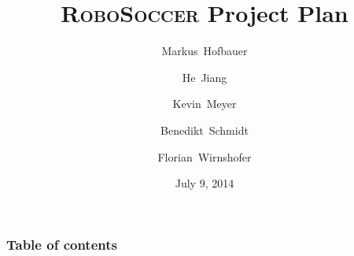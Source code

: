 \documentclass[hyperref={pdfpagelabels=false},compress]{beamer}
\title{\textsc{RoboSoccer} Project Plan}
\author[Hofbauer, Jiang, Meyer, Schmidt, Wirnshofer]{
  Markus~Hofbauer \and
  He~Jiang \and
  Kevin~Meyer \and
  Benedikt~Schmidt \and
  Florian~Wirnshofer
}
\institute
{
	Technische Universität München, Germany
}
\date{July 9, 2014}
\begin{document}
\begin{frame}
	\titlepage
\end{frame}

\begin{frame}
	\frametitle{Table of contents}
	\tableofcontents
\end{frame}

%
%
\end{document}
